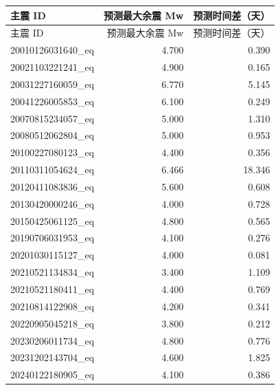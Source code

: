 \begingroup
\footnotesize
\setlength{\tabcolsep}{4pt}
\begin{longtable}{lrr}
\toprule
主震 ID & 预测最大余震 Mw & 预测时间差（天） \\
\midrule
\endfirsthead
\toprule
主震 ID & 预测最大余震 Mw & 预测时间差（天） \\
\midrule
\endhead
20010126031640\_eq & 4.700 & 0.390 \\
20021103221241\_eq & 4.900 & 0.165 \\
20031227160059\_eq & 6.770 & 5.145 \\
20041226005853\_eq & 6.100 & 0.249 \\
20070815234057\_eq & 5.000 & 1.310 \\
20080512062804\_eq & 5.000 & 0.953 \\
20100227080123\_eq & 4.400 & 0.356 \\
20110311054624\_eq & 6.466 & 18.346 \\
20120411083836\_eq & 5.600 & 0.608 \\
20130420000246\_eq & 4.000 & 0.728 \\
20150425061125\_eq & 4.800 & 0.565 \\
20190706031953\_eq & 4.100 & 0.276 \\
20201030115127\_eq & 4.000 & 0.081 \\
20210521134834\_eq & 3.400 & 1.109 \\
20210521180411\_eq & 4.400 & 0.769 \\
20210814122908\_eq & 4.200 & 0.341 \\
20220905045218\_eq & 3.800 & 0.212 \\
20230206011734\_eq & 4.800 & 0.776 \\
20231202143704\_eq & 4.600 & 1.825 \\
20240122180905\_eq & 4.100 & 0.386 \\
\bottomrule
\end{longtable}
\endgroup
